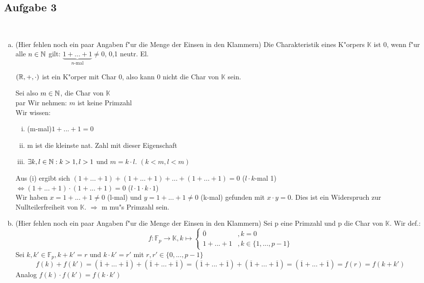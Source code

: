 \documentclass[a4paper,twoside,DIV15,BCOR12mm]{scrbook}
\newcommand{\enur}{\ \begin{enumerate}[(i)]}
\newcommand{\enua}{\ \begin{enumerate}[a)]}
\newcommand{\une}{\end{enumerate}}
\renewcommand{\K}{\ensuremath{\mathbb{K}}}
\renewcommand{\F}{\ensuremath{\mathbb{F}}}
\newcommand{\RA}{\Rightarrow}
\newcommand{\LRA}{\Leftrightarrow}
\newcommand{\x}{\cdot}
\begin{document}
\subsection{Aufgabe 3}
\enua
\item
  (Hier fehlen noch ein paar Angaben f"ur die Menge der Einsen in den Klammern)
  Die Charakteristik eines K"orpers $\K$ ist 0, wenn f"ur alle $n\in\mathbb{N}$ gilt: $\underbrace{1+...+1}_{n\mbox{-mal}}\neq0$\quad, 0,1 neutr. El.\par
  $(\MdR,+,\x)$ ist ein K"orper mit Char 0, also kann 0 nicht die Char von $\K$ sein.\par
  Sei also $m\in\mathbb{N}$, die Char von $\K$\\par
  Wir nehmen: $m$ ist keine Primzahl\\
  Wir wissen:
  \enur
    \item (m-mal)$1+...+1=0$
    \item m ist die kleinste nat. Zahl mit dieser Eigenschaft
    \item $\exists k,l\in\mathbb{N}: k>1, l>1$ und $m=k\x l$. $(k<m, l<m)$
  \une
  Aus (i) ergibt sich $(1+...+1)+(1+...+1)+...+(1+...+1)=0$ ($l\x k$-mal 1)\\
  $\LRA (1+...+1)\x(1+...+1)=0$ ($l\x1\x k\x1$)\\
  Wir haben $x=1+...+1\neq0$ (l-mal) und $y=1+...+1\neq0$ (k-mal) gefunden mit $x\x y=0$. Dies ist ein Widerspruch zur Nullteilerfreiheit von $\K$. $\RA$ m mu"s Primzahl sein.
\item
  (Hier fehlen noch ein paar Angaben f"ur die Menge der Einsen in den Klammern)
  Sei p eine Primzahl und p die Char von $\K$. Wir def.: \[f:\F_p\to\K, k\mapsto\left\{\begin{array}{ll}
  \overline0&,k=0\\
  1+...+1&, k\in\{1,...,p-1\}
  \end{array}\right.\]
  Sei $k,k'\in\F_p, k+k'=r$ und $k\x k'=r'$ mit $r,r'\in \{0,...,p-1\}$
  \[f(k)+f(k')=(\overline1+...+\overline1)+(\overline1+...+\overline1)=(\overline1+...+\overline1)+(\overline1+...+\overline1)=(\overline1+...+\overline1)=f(r)=f(k+k')\]
  Analog $f(k)\x f(k')=f(k\x k')$
\une
\end{document}
